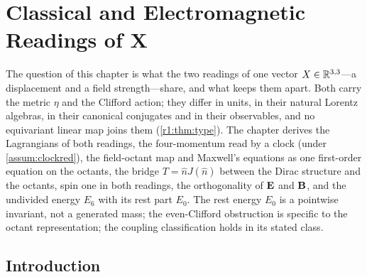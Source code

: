 \chapter{Classical and Electromagnetic Readings of X}
\label{ch:ch03_readings}

The question of this chapter is what the two readings of one vector $X\in\mathbb{R}^{3,3}$---a displacement and a field strength---share,
and what keeps them apart. Both carry the metric $\eta$ and the Clifford action; they differ in units, in their natural Lorentz
algebras, in their canonical conjugates and in their observables, and no equivariant linear map joins them (\cref{r1:thm:type}). The
chapter derives the Lagrangians of both readings, the four-momentum read by a clock (under \cref{assum:clockred}), the field-octant map
and Maxwell's equations as one first-order equation on the octants, the bridge $T=\hat nJ(\hat n)$ between the Dirac structure and the
octants, spin one in both readings, the orthogonality of $\mathbf E$ and $\mathbf B$, and the undivided energy $E_6$ with its rest part $E_0$. The
rest energy $E_0$ is a pointwise invariant, not a generated mass; the even-Clifford obstruction is specific to the octant representation;
the coupling classification holds in its stated class.



\section{Introduction}
\label{r0:sec:main}

